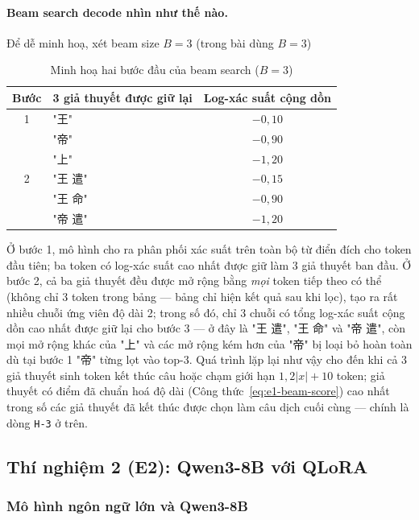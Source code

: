 \paragraph{Beam search decode nhìn như thế nào.} Để dễ minh hoạ, xét beam size $B=3$ (trong bài dùng $B=3$)

\begin{table}[H]
\centering\small
\caption{Minh hoạ hai bước đầu của beam search ($B=3$)}
\begin{tabular}{clc}
\toprule
\textbf{Bước} & \textbf{3 giả thuyết được giữ lại} & \textbf{Log-xác suất cộng dồn} \\
\midrule
1 & "王" & $-0{,}10$ \\
  & "帝" & $-0{,}90$ \\
  & "上" & $-1{,}20$ \\
\midrule
2 & "王 遣" & $-0{,}15$ \\
  & "王 命" & $-0{,}90$ \\
  & "帝 遣" & $-1{,}20$ \\
\bottomrule
\end{tabular}
\end{table}

Ở bước 1, mô hình cho ra phân phối xác suất trên toàn bộ từ điển đích cho token đầu
tiên; ba token có log-xác suất cao nhất được giữ làm 3 giả thuyết ban đầu. Ở bước 2, cả
ba giả thuyết đều được mở rộng bằng \emph{mọi} token tiếp theo có thể (không chỉ 3 token
trong bảng — bảng chỉ hiện kết quả sau khi lọc), tạo ra rất nhiều chuỗi ứng viên độ dài
2; trong số đó, chỉ 3 chuỗi có tổng log-xác suất cộng dồn cao nhất được giữ lại cho bước
3 — ở đây là "王 遣", "王 命" và "帝 遣", còn mọi mở rộng khác của "上" và các mở rộng kém
hơn của "帝" bị loại bỏ hoàn toàn dù tại bước 1 "帝" từng lọt vào top-3. Quá trình lặp lại
như vậy cho đến khi cả 3 giả thuyết sinh token kết thúc câu hoặc chạm giới hạn
$1{,}2|x|+10$ token; giả thuyết có điểm đã chuẩn hoá độ dài (Công thức~\ref{eq:e1-beam-score})
cao nhất trong số các giả thuyết đã kết thúc được chọn làm câu dịch cuối cùng — chính là
dòng \texttt{H-3} ở trên.

\subsection{Thí nghiệm 2 (E2): Qwen3-8B với QLoRA}

\subsubsection{Mô hình ngôn ngữ lớn và Qwen3-8B}

